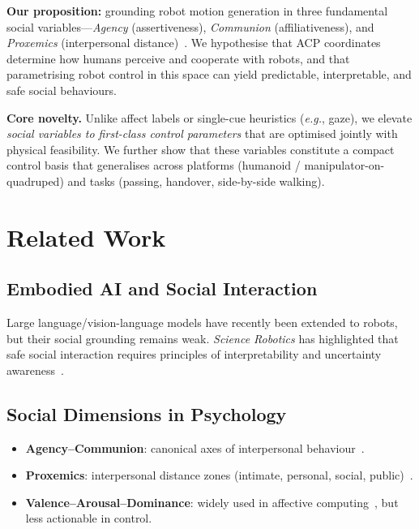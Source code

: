 \documentclass[journal]{IEEEtran}
\begin{document}
\textbf{Our proposition:} grounding robot motion generation in three fundamental social variables---\emph{Agency} (assertiveness), \emph{Communion} (affiliativeness), and \emph{Proxemics} (interpersonal distance)~\cite{wiggins1991agency, hall1966hidden}. We hypothesise that ACP coordinates determine how humans perceive and cooperate with robots, and that parametrising robot control in this space can yield predictable, interpretable, and safe social behaviours.

\textbf{Core novelty.} Unlike affect labels or single-cue heuristics (\emph{e.g.}, gaze), we elevate \emph{social variables to first-class control parameters} that are optimised jointly with physical feasibility. We further show that these variables constitute a compact control basis that generalises across platforms (humanoid / manipulator-on-quadruped) and tasks (passing, handover, side-by-side walking).

\section{Related Work}\label{sec:related}

\subsection{Embodied AI and Social Interaction}
Large language/vision-language models have recently been extended to robots, but their social grounding remains weak. \emph{Science Robotics} has highlighted that safe social interaction requires principles of interpretability and uncertainty awareness~\cite{belkaid2021gaze}.

\subsection{Social Dimensions in Psychology}
\begin{itemize}
\item \textbf{Agency--Communion}: canonical axes of interpersonal behaviour~\cite{wiggins1991agency}.
\item \textbf{Proxemics}: interpersonal distance zones (intimate, personal, social, public)~\cite{hall1966hidden}.
\item \textbf{Valence--Arousal--Dominance}: widely used in affective computing~\cite{russell1980circumplex}, but less actionable in control.
\end{itemize}
\end{document}
